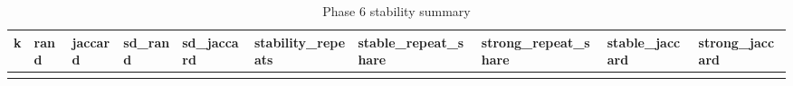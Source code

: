 \documentclass[
]{article}
\begin{document}
\begin{longtable}[]{@{}
  >{\raggedleft\arraybackslash}p{}
  >{\raggedleft\arraybackslash}p{}
  >{\raggedleft\arraybackslash}p{}
  >{\raggedleft\arraybackslash}p{}
  >{\raggedleft\arraybackslash}p{}
  >{\raggedleft\arraybackslash}p{}
  >{\raggedleft\arraybackslash}p{}
  >{\raggedleft\arraybackslash}p{}
  >{\raggedright\arraybackslash}p{}
  >{\raggedright\arraybackslash}p{}@{}}
\caption{Phase 6 stability summary}\tabularnewline
\toprule\noalign{}
\begin{minipage}[b]{\linewidth}\raggedleft
k
\end{minipage} & \begin{minipage}[b]{\linewidth}\raggedleft
rand
\end{minipage} & \begin{minipage}[b]{\linewidth}\raggedleft
jaccard
\end{minipage} & \begin{minipage}[b]{\linewidth}\raggedleft
sd\_rand
\end{minipage} & \begin{minipage}[b]{\linewidth}\raggedleft
sd\_jaccard
\end{minipage} & \begin{minipage}[b]{\linewidth}\raggedleft
stability\_repeats
\end{minipage} & \begin{minipage}[b]{\linewidth}\raggedleft
stable\_repeat\_share
\end{minipage} & \begin{minipage}[b]{\linewidth}\raggedleft
strong\_repeat\_share
\end{minipage} & \begin{minipage}[b]{\linewidth}\raggedright
stable\_jaccard
\end{minipage} & \begin{minipage}[b]{\linewidth}\raggedright
strong\_jaccard
\end{minipage} \\
\midrule\noalign{}
\endfirsthead
\toprule\noalign{}
\begin{minipage}[b]{\linewidth}\raggedleft

\end{minipage}
\end{longtable}
\end{document}
